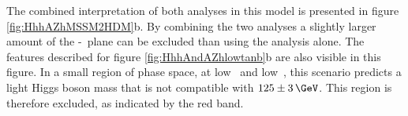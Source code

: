 The combined interpretation of both analyses in this model is presented in figure 
\ref{fig:HhhAZhMSSM2HDM}b.
By combining the two analyses a slightly larger amount
of the \mA-\tanb~plane can be excluded than using the \AtoZhtolltautau analysis alone. The features
described for figure \ref{fig:HhhAndAZhlowtanb}b are also visible in this figure. In a small region of phase
space, at low \mA~and low~\tanb, this scenario predicts a light Higgs boson mass that is not compatible with $125\pm3\,\GeV$.
This region is therefore excluded, as indicated by the red band. 



